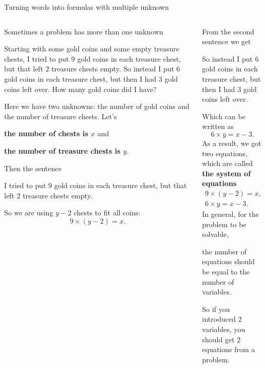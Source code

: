 \documentclass[9pt,aspectratio=169]{beamer}
\begin{document}
\begin{frame}{Turning words into formulas with multiple unknown}
  \begin{columns}[T]
    \begin{column}{0.5\textwidth}
      Sometimes a problem has more than one unknown
      \begin{problem}
        Starting with some gold coins and some empty treasure chests, I tried to put $9$ gold coins in each treasure chest, but that left $2$ treasure chests empty. So instead I put $6$ gold coins in each treasure chest, but then I had $3$ gold coins left over. How many gold coins did I have?
      \end{problem}
      Here we have two unknowns: the number of gold coins and the number of treasure chests. Let's
      
      \textbf{the number of chests is $x$} and 
      
      \textbf{the number of treasure chests is $y$}.
      
      Then the sentence
      \begin{problem}
        I tried to put $9$ gold coins in each treasure chest, but that left $2$ treasure chests empty.
      \end{problem}
      So we are using $y - 2$ chests to fit all coins: 
      \[ 9 \times (y - 2) = x. \]
    \end{column}
    \begin{column}{0.5\textwidth}
      From the second sentence we get
      \begin{problem}
        So instead I put $6$ gold coins in each treasure chest, but then I had $3$ gold coins left over.
      \end{problem}
      Which can be written as
      \[ 6 \times y = x - 3. \]
      As a result, we got two equations, which are called \textbf{the system of equations}
      \begin{gather*}
        9 \times (y - 2) = x,\\
        6 \times y = x - 3.
      \end{gather*}
      In general, for the problem to be solvable, 
      \begin{definition}
        the number of equations should be equal to the number of variables.
      \end{definition} 
      So if you introduced $2$ variables, you should get $2$ equations from a problem.
    \end{column}
  \end{columns}
\end{frame}
\end{document}
